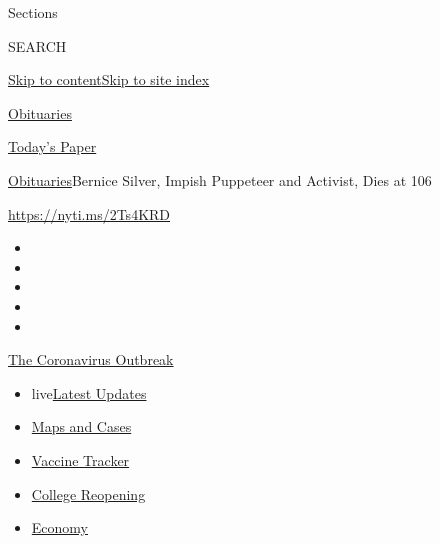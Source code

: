 Sections

SEARCH

\protect\hyperlink{site-content}{Skip to
content}\protect\hyperlink{site-index}{Skip to site index}

\href{https://www.nytimes.com/section/obituaries}{Obituaries}

\href{https://myaccount.nytimes.com/auth/login?response_type=cookie\&client_id=vi}{}

\href{https://www.nytimes.com/section/todayspaper}{Today's Paper}

\href{/section/obituaries}{Obituaries}\textbar{}Bernice Silver, Impish
Puppeteer and Activist, Dies at 106

\url{https://nyti.ms/2Ts4KRD}

\begin{itemize}
\item
\item
\item
\item
\item
\end{itemize}

\href{https://www.nytimes.com/news-event/coronavirus?action=click\&pgtype=Article\&state=default\&region=TOP_BANNER\&context=storylines_menu}{The
Coronavirus Outbreak}

\begin{itemize}
\tightlist
\item
  live\href{https://www.nytimes.com/2020/08/03/world/coronavirus-covid-19.html?action=click\&pgtype=Article\&state=default\&region=TOP_BANNER\&context=storylines_menu}{Latest
  Updates}
\item
  \href{https://www.nytimes.com/interactive/2020/us/coronavirus-us-cases.html?action=click\&pgtype=Article\&state=default\&region=TOP_BANNER\&context=storylines_menu}{Maps
  and Cases}
\item
  \href{https://www.nytimes.com/interactive/2020/science/coronavirus-vaccine-tracker.html?action=click\&pgtype=Article\&state=default\&region=TOP_BANNER\&context=storylines_menu}{Vaccine
  Tracker}
\item
  \href{https://www.nytimes.com/2020/08/02/us/covid-college-reopening.html?action=click\&pgtype=Article\&state=default\&region=TOP_BANNER\&context=storylines_menu}{College
  Reopening}
\item
  \href{https://www.nytimes.com/live/2020/08/03/business/stock-market-today-coronavirus?action=click\&pgtype=Article\&state=default\&region=TOP_BANNER\&context=storylines_menu}{Economy}
\end{itemize}


